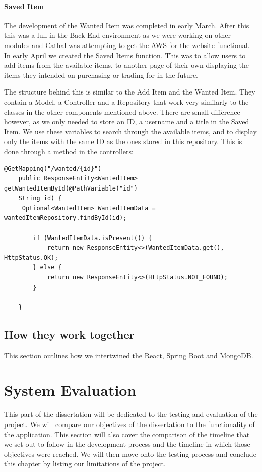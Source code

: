 \subsubsection{Saved Item}
The development of the Wanted Item was completed in early March. After this this was a lull in the Back End environment as we were working on other modules and Cathal was attempting to get the AWS for the website functional. In early April we created the Saved Items function. This was to allow users to add items from the available items, to another page of their own displaying the items they intended on purchasing or trading for in the future. \par
The structure behind this is similar to the Add Item and the Wanted Item. They contain a Model, a Controller and a Repository that work very similarly to the classes in the other components mentioned above. There are small difference however, as we only needed to store an ID, a username and a title in the Saved Item. We use these variables to search through the available items, and to display only the items with the same ID as the ones stored in this repository. This is done through a method in the controllers: \par
\begin{verbatim}
@GetMapping("/wanted/{id}")
    public ResponseEntity<WantedItem> getWantedItemById(@PathVariable("id")
    String id) {
     Optional<WantedItem> WantedItemData = wantedItemRepository.findById(id);

        if (WantedItemData.isPresent()) {
            return new ResponseEntity<>(WantedItemData.get(), HttpStatus.OK);
        } else {
            return new ResponseEntity<>(HttpStatus.NOT_FOUND);
        }

    }
\end{verbatim}
\section{How they work together}
This section outlines how we intertwined the React, Spring Boot and MongoDB.



\chapter{System Evaluation}
This part of the dissertation will be dedicated to the testing and evaluation of the project. We will compare our objectives of the dissertation to the functionality of the application. This section will also cover the comparison of the timeline that we set out to follow in the development process and the timeline in which those objectives were reached. We will then move onto the testing process and conclude this chapter by listing our limitations of the project.\par

